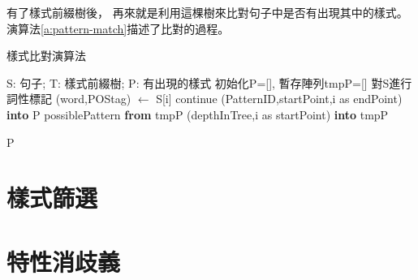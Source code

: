 有了樣式前綴樹後，
再來就是利用這棵樹來比對句子中是否有出現其中的樣式。
演算法\ref{a:pattern-match}描述了比對的過程。

\begin{algorithm}
    \caption{樣式比對演算法}
    \label{a:pattern-match}
    \begin{algorithmic}[1]
        \Require  
            S: 句子;
            T: 樣式前綴樹;
        \Ensure
            P: 有出現的樣式
        \State 初始化P=[], 暫存陣列tmpP=[]
        \State 對S進行詞性標記
            \State (word,POStag) $\gets$ S[i]
                    \State continue
                \Else
                         (PatternID,startPoint,i as endPoint) {\bf into} P
                    \EndIf
                     possiblePattern {\bf from} tmpP
                \EndIf
            \EndFor
             (depthInTree,i as startPoint) {\bf into} tmpP
            \EndIf
        \EndFor
        

        \State \Return P
    \end{algorithmic}
\end{algorithm}



\section{樣式篩選}
\label{s:select-pattern}

\section{特性消歧義}
\label{s:pattern-disambiguity}


